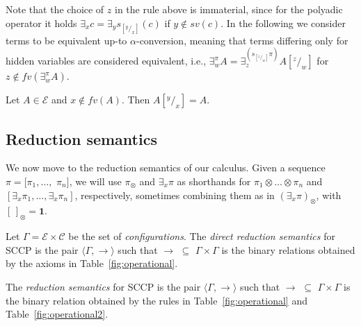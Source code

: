 \documentclass{llncs}
\def\1{{\mathbf 1}}
\def\C{{\mathcal C}}
\def\1{{\mathbf 1}}
\def\C{{\mathcal C}}
\def\odiv{\, {\ominus\hspace{-7.7pt} \div} \,}
\begin{document}
Note that the choice of $z$ in the rule above is immaterial, since for the polyadic operator it holds
$\exists_x c = \exists_y s_{[^y/_x]}(c)$ if $y \not \in sv(c)$.
%
In the following we consider terms to be equivalent up-to $\alpha$-conversion, meaning that terms 
differing only for hidden variables are considered equivalent, i.e.,
$\exists_w^\pi A = \exists_z^{(s_{[^z/_w]}\pi)} A[^z/_w]$ for $z \not \in fv(\exists^{\pi}_w A)$.

\begin{lemma}
Let $A \in \mathcal{E}$ and $x \not \in fv(A)$. Then $A[^y/_x] = A$.
\end{lemma}


\subsection{Reduction semantics}
We now move to the reduction semantics of our calculus. 
%
Given a sequence $\pi = [\pi_1, \ldots,$ $\pi_n]$, we will use 
$\pi_\otimes$ and $\exists_x \pi$
as shorthands for $\pi_1 \otimes \ldots \otimes \pi_n$ and
$[\exists_x \pi_1, \ldots, \exists_x \pi_n]$, respectively,
sometimes combining them as in $(\exists_x \pi)_\otimes$,
with $[\,]_\otimes = \1$.

\begin{definition}[Reductions]\label{def:reductions}
Let $\Gamma = {\mathcal E} \times \C$ be the set of \emph{configurations}.
The \emph{direct reduction semantics} for SCCP is the pair 
$\langle \Gamma,  \to \rangle$
such that $\to \, \, \subseteq \, \,\Gamma \times   \Gamma$ is the 
binary relations obtained by the axioms in 
Table~\ref{fig:operational}.

The \emph{reduction semantics} for SCCP is the pair 
$\langle \Gamma,  \rightarrow \rangle$
such that $\rightarrow \, \, \subseteq \, \,\Gamma \times   \Gamma$ is the
binary relation obtained by the rules in 
Table~\ref{fig:operational} and Table~\ref{fig:operational2}.
\end{definition}

\end{document}

